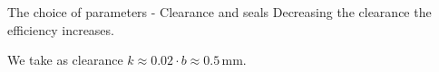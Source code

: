 \documentclass{beamer}
\begin{document}
\begin{frame}[t]{The choice of parameters - Clearance and seals}
Decreasing the clearance the efficiency increases.

We take as clearance $k \approx 0.02 \cdot b \approx 0.5\, \text{mm}$.

\vspace{-0.5cm}
\begin{figure}%
    \centering
\end{figure}
\end{frame}
\end{document}

